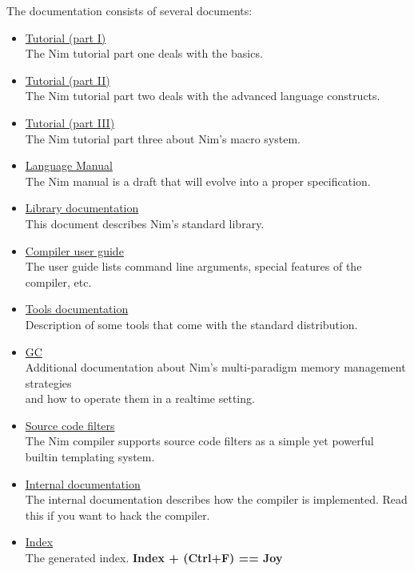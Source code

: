The documentation consists of several documents:

\begin{itemize}
\item
  \href{tut1.html}{Tutorial (part I)}\\
  The Nim tutorial part one deals with the basics.
\item
  \href{tut2.html}{Tutorial (part II)}\\
  The Nim tutorial part two deals with the advanced language constructs.
\item
  \href{tut3.html}{Tutorial (part III)}\\
  The Nim tutorial part three about Nim's macro system.
\item
  \href{manual.html}{Language Manual}\\
  The Nim manual is a draft that will evolve into a proper
  specification.
\item
  \href{lib.html}{Library documentation}\\
  This document describes Nim's standard library.
\item
  \href{nimc.html}{Compiler user guide}\\
  The user guide lists command line arguments, special features of the
  compiler, etc.
\item
  \href{tools.html}{Tools documentation}\\
  Description of some tools that come with the standard distribution.
\item
  \href{gc.html}{GC}\\
  Additional documentation about Nim's multi-paradigm memory management
  strategies\\
  and how to operate them in a realtime setting.
\item
  \href{filters.html}{Source code filters}\\
  The Nim compiler supports source code filters as a simple yet powerful
  builtin templating system.
\item
  \href{intern.html}{Internal documentation}\\
  The internal documentation describes how the compiler is implemented.
  Read this if you want to hack the compiler.
\item
  \href{theindex.html}{Index}\\
  The generated index. \textbf{Index + (Ctrl+F) == Joy}
\end{itemize}
